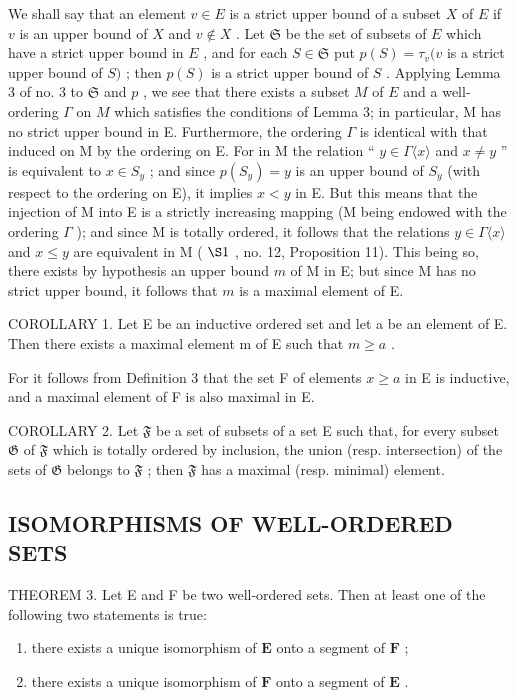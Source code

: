 We shall say that an element \(v \in E\) is a strict upper bound of a subset \(X\) of \(E\) if \(v\) is an upper bound of \(X\) and \(v \notin X\) . Let \(\mathfrak{S}\) be the set of subsets of \(E\) which have a strict upper bound in \(E\) , and for each \(S \in \mathfrak{S}\) put \(p(S) = \tau_v(v\) is a strict upper bound of \(S)\) ; then \(p(S)\) is a strict upper bound of \(S\) . Applying Lemma 3 of no. 3 to \(\mathfrak{S}\) and \(p\) , we see that there exists a subset \(M\) of \(E\) and a well-ordering \(\Gamma\) on \(M\) which satisfies the conditions of Lemma 3; in particular, M has no strict upper bound in E. Furthermore, the ordering \(\Gamma\) is identical with that induced on M by the ordering on E. For in M the relation `` \(y \in \Gamma\langle x \rangle\) and \(x \neq y\) '' is equivalent to \(x \in S_y\) ; and since \(p(S_y) = y\) is an upper bound of \(S_y\) (with respect to the ordering on E), it implies \(x < y\) in E. But this means that the injection of M into E is a strictly increasing mapping (M being endowed with the ordering \(\Gamma\) ); and since M is totally ordered, it follows that the relations \(y \in \Gamma\langle x \rangle\) and \(x \leqslant y\) are equivalent in M ( \(\S 1\) , no. 12, Proposition 11). This being so, there exists by hypothesis an upper bound \(m\) of M in E; but since M has no strict upper bound, it follows that \(m\) is a maximal element of E.

COROLLARY 1. Let E be an inductive ordered set and let a be an element of E. Then there exists a maximal element m of E such that \(m \geqslant a\) .

For it follows from Definition 3 that the set F of elements \(x \geqslant a\) in E is inductive, and a maximal element of F is also maximal in E.

COROLLARY 2. Let \(\mathfrak{F}\) be a set of subsets of a set E such that, for every subset \(\mathfrak{G}\) of \(\mathfrak{F}\) which is totally ordered by inclusion, the union (resp. intersection) of the sets of \(\mathfrak{G}\) belongs to \(\mathfrak{F}\) ; then \(\mathfrak{F}\) has a maximal (resp. minimal) element.

\subsection{ISOMORPHISMS OF WELL-ORDERED SETS}

THEOREM 3. Let E and F be two well-ordered sets. Then at least one of the following two statements is true:

\begin{enumerate}
\def\labelenumi{(\arabic{enumi})}
\item
  there exists a unique isomorphism of \(\mathbf{E}\) onto a segment of \(\mathbf{F}\) ;
\item
  there exists a unique isomorphism of \(\mathbf{F}\) onto a segment of \(\mathbf{E}\) .
\end{enumerate}

